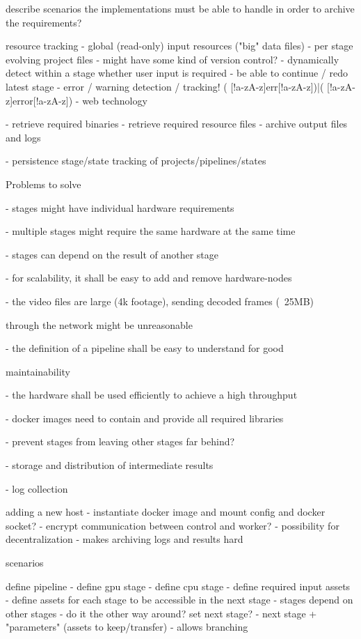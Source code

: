 describe scenarios the implementations must be able to handle in order to archive the requirements?

resource tracking
 - global (read-only) input resources ("big" data files)
 - per stage evolving project files
   - might have some kind of version control?
 - dynamically detect within a stage whether user input is required
 - be able to continue / redo latest stage
 - error / warning detection / tracking!
   ( [!a-zA-z]err[!a-zA-z])|( [!a-zA-z]error[!a-zA-z])
 - web technology

- retrieve required binaries
- retrieve required resource files
- archive output files and logs

- persistence stage/state tracking of projects/pipelines/states

Problems to solve



- stages might have individual hardware requirements

- multiple stages might require the same hardware at the same time

- stages can depend on the result of another stage

- for scalability, it shall be easy to add and remove hardware-nodes

- the video files are large (4k footage), sending decoded frames (~25MB)

through the network might be unreasonable

- the definition of a pipeline shall be easy to understand for good

maintainability

- the hardware shall be used efficiently to achieve a high throughput

- docker images need to contain and provide all required libraries

- prevent stages from leaving other stages far behind?

- storage and distribution of intermediate results

- log collection




adding a new host
 - instantiate docker image and mount config and docker socket?
 - encrypt communication between control and worker?
 - possibility for decentralization
    - makes archiving logs and results hard


scenarios

define pipeline
 - define gpu stage
 - define cpu stage
 - define required input assets
 - define assets for each stage to be accessible in the next stage
 - stages depend on other stages
    - do it the other way around? set next stage?
       - next stage + "parameters" (assets to keep/transfer)
       - allows branching

